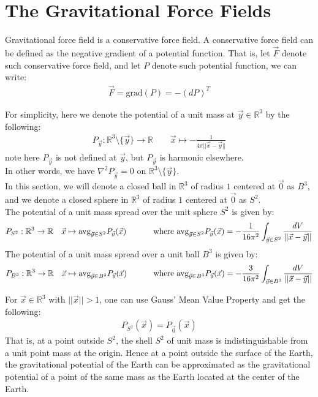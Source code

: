 \documentclass[15pt]{book}
\theoremstyle{break}
\theoremstyle{break}
\newcommand{\R}{\mathbb{R}}
\begin{document}
\newpage
\section[The Gravitational Force Field]{\color{red}The Gravitational Force Fields\color{black}}
Gravitational force field is a conservative force field. A conservative force field can be defined as the negative gradient of a potential function. That is, let $\vec{F}$ denote such conservative force field, and let $P$ denote such potential function, we can write:
\begin{align*}
\vec{F} = \text{grad}(P) = -(dP)^T
\end{align*}


For simplicity, here we denote the potential of a unit mass at $\vec{y}\in \R^3$ by the following:
\begin{align*}
P_{\vec{y}} : \R^3\setminus \{\vec{y}\} \to \R \qquad \vec{x}\mapsto -\frac{1}{4\pi ||\vec{x} - \vec{y}||}
\end{align*}
note here $P_{\vec{y}}$ is not defined at $\vec{y}$, but $P_{\vec{y}}$ is harmonic elsewhere. \\
In other words, we have $\nabla^2 P_{\vec{y}} = 0$ on $\R^3\setminus \{\vec{y}\}$.\\

In this section, we will denote a closed ball in $\R^3$ of radius $1$ centered at $\vec{0}$ as $B^3$, and we denote a closed sphere in $\R^3$ of radius $1$ centered at $\vec{0}$ as $S^2$.\\

The potential of a unit mass spread over the unit sphere $S^2$ is given by:
\begin{align*}
P_{S^2} : \R^3 \to \R \ \ \ \vec{x}\mapsto\text{\text{avg}}_{\vec{y}\in S^2}P_{\vec{y}}(\vec{x})\qquad\quad\  \text{where}\  \text{\text{avg}}_{\vec{y}\in S^2}P_{\vec{y}}(\vec{x})=- \frac{1}{16\pi^2}\int_{\vec{y}\in S^2} \frac{dV}{||\vec{x}-\vec{y}||}
\end{align*}
The potential of a unit mass spread over a unit ball $B^3$ is given by:
\begin{align*}
P_{B^3} : \R^3 \to \R \ \ \ \vec{x}\mapsto\text{\text{avg}}_{\vec{y}\in B^3}P_{\vec{y}}(\vec{x}) \qquad\quad\  \text{where}\   \text{\text{avg}}_{\vec{y}\in B^3}P_{\vec{y}}(\vec{x})=- \frac{3}{16\pi^2}\int_{\vec{y}\in B^3} \frac{dV}{||\vec{x}-\vec{y}||}
\end{align*}

For $\vec{x}\in \R^3$ with $||\vec{x}|| >1$, one can use Gauss' Mean Value Property and get the following:
\begin{align*}
P_{S^2}(\vec{x}) = P_{\vec{0}}(\vec{x})
\end{align*}
That is, at a point outside $S^2$, the shell $S^2$ of unit mass is indistinguishable from a unit point mass at the origin. Hence at a point outside the surface of the Earth, the gravitational potential of the Earth can be approximated as the gravitational potential of a point of the same mass as the Earth located at the center of the Earth.
\end{document}
